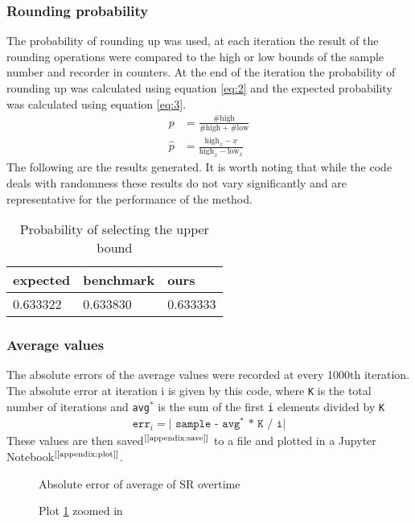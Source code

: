 \documentclass[a4paper]{article} %
\begin{document}
\begin{multicols}{2}
\subsubsection{Rounding probability}
The probability of rounding up was used, at each iteration the result of the rounding operations were compared to the high or low bounds of the sample number and recorder in counters. At the end of the iteration the probability of rounding up was calculated using equation \ref{eq:2} and the expected probability was calculated using equation \ref{eq:3}.
\begin{align}
    p &= \frac{\#\text{high}}{\#\text{high}+\#\text{low}} \label{eq:2} \\
    \hat{p} &= \frac{\text{high}_x - x}{\text{high}_x - \text{low}_x} \label{eq:3}
\end{align}
The following are the results generated. It is worth noting that while the code deals with randomness these results do not vary significantly and are representative for the performance of the method.
\begin{table}[H]
\centering
\begin{tabular}{ |p{1.5cm}|p{1.5cm}|p{1.5cm}| }
 \hline
 expected & benchmark & ours \\
 \hline
 0.633322 & 0.633830 & 0.633333 \\
 \hline
\end{tabular}
\caption{Probability of selecting the upper bound}
\label{table:2}
\end{table}

\subsubsection{Average values}
The absolute errors of the average values were recorded at every 1000th iteration. The absolute error at iteration i is given by this code, where \verb|K| is the total number of iterations and \verb|avg|$^*$ is the sum of the first \verb|i| elements divided by \verb|K|
\begin{align}
\texttt{
    err$_i= |$ sample - avg$^*$ * K / i$|$
}
\end{align}
These values are then saved$^\text{[\ref{appendix:save}]}$ to a file and plotted in a Jupyter Notebook$^\text{[\ref{appendix:plot}]}$.

\begin{figure}[H]
    
    \caption{Absolute error of average of SR overtime}
    \label{fig:p1}
\end{figure}
\begin{figure}[H]
    
    \caption{Plot \ref{fig:p1} zoomed in}
    \label{fig:p2}
\end{figure}
\newpage
\end{multicols}
\end{document}
